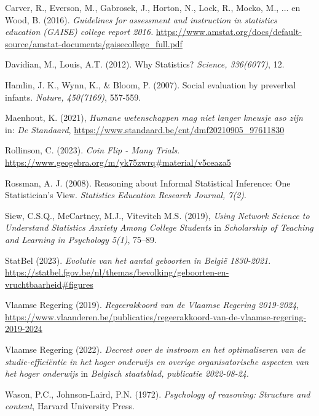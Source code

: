 \begin{bronnen}

    \item Carver, R., Everson, M., Gabrosek, J., Horton, N., Lock, R., Mocko, M., ... en Wood, B. (2016). \emph{Guidelines for assessment and instruction in statistics education (GAISE) college report 2016.} \url{https://www.amstat.org/docs/default-source/amstat-documents/gaisecollege_full.pdf}
    \item Davidian, M., Louis, A.T. (2012). Why Statistics? \emph{Science, 336(6077)}, 12.
    \item Hamlin, J. K., Wynn, K., \& Bloom, P. (2007). Social evaluation by preverbal infants. \emph{Nature, 450(7169)}, 557-559.
    \item Maenhout, K. (2021), \emph{Humane wetenschappen mag niet langer kneusje aso zijn} in: \emph{De Standaard}, \url{https://www.standaard.be/cnt/dmf20210905_97611830}
    \item Rollinson, C. (2023). \emph{Coin Flip - Many Trials}. \url{https://www.geogebra.org/m/yk75zwrq#material/v5ceaza5}
    \item Rossman, A. J. (2008). Reasoning about Informal Statistical Inference: One Statistician's View. \emph{Statistics Education Research Journal, 7(2)}.
    \item Siew,  C.S.Q., McCartney, M.J., Vitevitch M.S. (2019), \emph{Using Network Science to Understand Statistics Anxiety Among College Students} in \emph{Scholarship of Teaching and Learning in Psychology 5(1)}, 75–89.
    \item StatBel  (2023). \emph{Evolutie van het aantal geboorten in Belgi\"e 1830-2021}. \url{https://statbel.fgov.be/nl/themas/bevolking/geboorten-en-vruchtbaarheid#figures}
    \item Vlaamse Regering (2019). \emph{Regeerakkoord van de Vlaamse Regering 2019-2024}, \url{https://www.vlaanderen.be/publicaties/regeerakkoord-van-de-vlaamse-regering-2019-2024}
    \item Vlaamse Regering (2022). \emph{Decreet over de instroom en het optimaliseren van de studie-efficiëntie in het hoger onderwijs en overige organisatorische aspecten van het hoger onderwijs} in \emph{Belgisch staatsblad, publicatie 2022-08-24}.
    \item Wason, P.C., Johnson-Laird, P.N. (1972).
    \emph{Psychology of reasoning: Structure and content}, Harvard University Press.
\end{bronnen}

